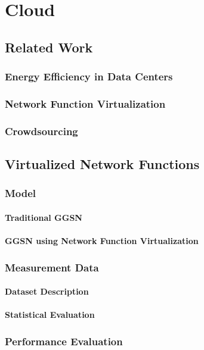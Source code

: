 \chapter{Cloud}\label{chap:cloud}

\section{Related Work}
\subsection{Energy Efficiency in Data Centers}
\subsection{Network Function Virtualization}
\subsection{Crowdsourcing}



\section{Virtualized Network Functions}
\cite{Metzger2014a}
\subsection{Model}
\subsubsection*{Traditional GGSN}
\subsubsection*{GGSN using Network Function Virtualization}
\subsection{Measurement Data}
\subsubsection*{Dataset Description}
\subsubsection*{Statistical Evaluation}
\subsection{Performance Evaluation}
